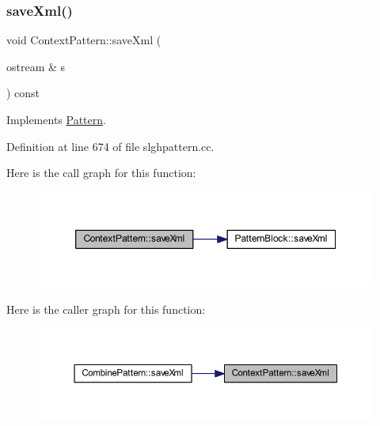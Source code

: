 \subsubsection{\texorpdfstring{saveXml()}{saveXml()}}
{\footnotesize\ttfamily void Context\+Pattern\+::save\+Xml (\begin{DoxyParamCaption}\item[{ostream \&}]{s }\end{DoxyParamCaption}) const\hspace{0.3cm}{\ttfamily [virtual]}}



Implements \mbox{\hyperlink{class_pattern_a1ad6c2ad66849318427095662b718fa9}{Pattern}}.



Definition at line 674 of file slghpattern.\+cc.

Here is the call graph for this function\+:
\nopagebreak
\begin{figure}[H]
\begin{center}
\leavevmode
\includegraphics[width=350pt]{class_context_pattern_a405d7ca6e777696895091684d1debfd8_cgraph}
\end{center}
\end{figure}
Here is the caller graph for this function\+:
\nopagebreak
\begin{figure}[H]
\begin{center}
\leavevmode
\includegraphics[width=350pt]{class_context_pattern_a405d7ca6e777696895091684d1debfd8_icgraph}
\end{center}
\end{figure}
\mbox{\label{class_context_pattern_acc26908cd60dbce4c4e13afed17036ba}} 
